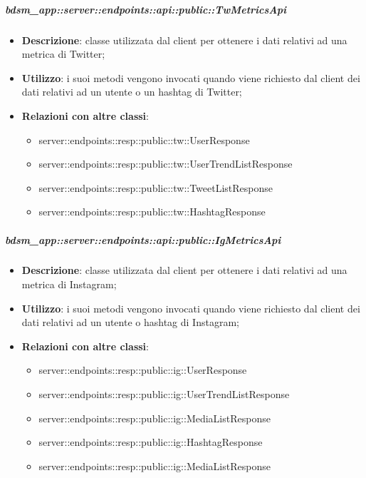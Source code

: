     \subparagraph{bdsm\_app::server::endpoints::api::public::TwMetricsApi} %
    \label{subp:bdsm_app_server_endpoints_api_public_twmetricsapi}
    \begin{itemize}
      \item \textbf{Descrizione}: classe utilizzata dal client per ottenere i dati relativi ad una metrica di Twitter;
      \item \textbf{Utilizzo}: i suoi metodi vengono invocati quando viene richiesto dal client dei dati relativi ad un utente o un hashtag di Twitter;
      \item \textbf{Relazioni con altre classi}:
        \begin{itemize}
          \item server::endpoints::resp::public::tw::UserResponse
          \item server::endpoints::resp::public::tw::UserTrendListResponse
          \item server::endpoints::resp::public::tw::TweetListResponse
          \item server::endpoints::resp::public::tw::HashtagResponse
        \end{itemize}
      \end{itemize}
    
    \subparagraph{bdsm\_app::server::endpoints::api::public::IgMetricsApi} %
    \label{subp:bdsm_app_server_endpoints_api_public_igmetricsapi}
    \begin{itemize}
      \item \textbf{Descrizione}: classe utilizzata dal client per ottenere i dati relativi ad una metrica di Instagram;
      \item \textbf{Utilizzo}: i suoi metodi vengono invocati quando viene richiesto dal client dei dati relativi ad un utente o hashtag di Instagram;
      \item \textbf{Relazioni con altre classi}:
        \begin{itemize}
          \item server::endpoints::resp::public::ig::UserResponse
          \item server::endpoints::resp::public::ig::UserTrendListResponse
          \item server::endpoints::resp::public::ig::MediaListResponse
          \item server::endpoints::resp::public::ig::HashtagResponse
          \item server::endpoints::resp::public::ig::MediaListResponse
        \end{itemize}
      \end{itemize}

